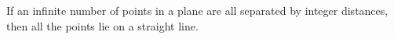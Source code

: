 \documentclass[12pt]{article}
\begin{document}
If an infinite number of points in a plane are all separated by integer distances, then all the points lie on a straight line.
\end{document}
